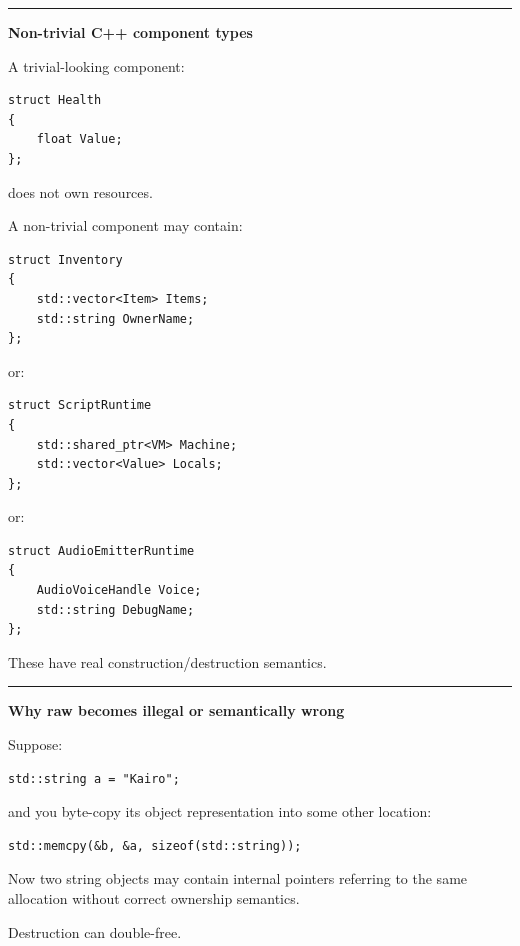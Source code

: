 \begin{center}\rule{0.5\linewidth}{0.5pt}\end{center}

\textbf{Non-trivial C++ component types}

A trivial-looking component:

\begin{verbatim}
struct Health
{
    float Value;
};
\end{verbatim}

does not own resources.

A non-trivial component may contain:

\begin{verbatim}
struct Inventory
{
    std::vector<Item> Items;
    std::string OwnerName;
};
\end{verbatim}

or:

\begin{verbatim}
struct ScriptRuntime
{
    std::shared_ptr<VM> Machine;
    std::vector<Value> Locals;
};
\end{verbatim}

or:

\begin{verbatim}
struct AudioEmitterRuntime
{
    AudioVoiceHandle Voice;
    std::string DebugName;
};
\end{verbatim}

These have real construction/destruction semantics.

\begin{center}\rule{0.5\linewidth}{0.5pt}\end{center}

\textbf{Why raw  becomes illegal or semantically wrong}

Suppose:

\begin{verbatim}
std::string a = "Kairo";
\end{verbatim}

and you byte-copy its object representation into some other location:

\begin{verbatim}
std::memcpy(&b, &a, sizeof(std::string));
\end{verbatim}

Now two string objects may contain internal pointers referring to the same allocation without correct ownership semantics.

Destruction can double-free.

